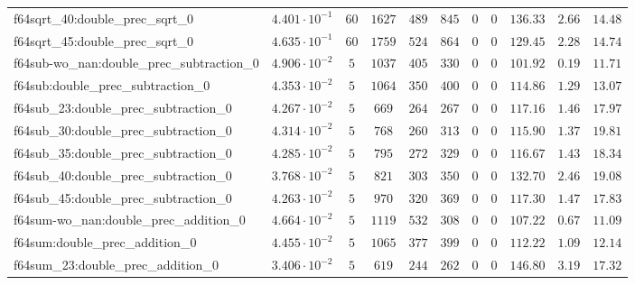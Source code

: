 \begin{tabular}{|l|c|c|c|c|c|c|c|c|c|c|}
f64sqrt\_40:double\_prec\_sqrt\_0              & $ 4.401 \cdot 10^{-1} $ & $ 60     $ & $ 1627   $ & $ 489   $ & $ 845   $ & $ 0   $ & $ 0 $ & $ 136.33      $ & $ 2.66    $ & $ 14.48   $ \\
f64sqrt\_45:double\_prec\_sqrt\_0              & $ 4.635 \cdot 10^{-1} $ & $ 60     $ & $ 1759   $ & $ 524   $ & $ 864   $ & $ 0   $ & $ 0 $ & $ 129.45      $ & $ 2.28    $ & $ 14.74   $ \\
f64sub-wo\_nan:double\_prec\_subtraction\_0    & $ 4.906 \cdot 10^{-2} $ & $ 5      $ & $ 1037   $ & $ 405   $ & $ 330   $ & $ 0   $ & $ 0 $ & $ 101.92      $ & $ 0.19    $ & $ 11.71   $ \\
f64sub:double\_prec\_subtraction\_0            & $ 4.353 \cdot 10^{-2} $ & $ 5      $ & $ 1064   $ & $ 350   $ & $ 400   $ & $ 0   $ & $ 0 $ & $ 114.86      $ & $ 1.29    $ & $ 13.07   $ \\
f64sub\_23:double\_prec\_subtraction\_0        & $ 4.267 \cdot 10^{-2} $ & $ 5      $ & $ 669    $ & $ 264   $ & $ 267   $ & $ 0   $ & $ 0 $ & $ 117.16      $ & $ 1.46    $ & $ 17.97   $ \\
f64sub\_30:double\_prec\_subtraction\_0        & $ 4.314 \cdot 10^{-2} $ & $ 5      $ & $ 768    $ & $ 260   $ & $ 313   $ & $ 0   $ & $ 0 $ & $ 115.90      $ & $ 1.37    $ & $ 19.81   $ \\
f64sub\_35:double\_prec\_subtraction\_0        & $ 4.285 \cdot 10^{-2} $ & $ 5      $ & $ 795    $ & $ 272   $ & $ 329   $ & $ 0   $ & $ 0 $ & $ 116.67      $ & $ 1.43    $ & $ 18.34   $ \\
f64sub\_40:double\_prec\_subtraction\_0        & $ 3.768 \cdot 10^{-2} $ & $ 5      $ & $ 821    $ & $ 303   $ & $ 350   $ & $ 0   $ & $ 0 $ & $ 132.70      $ & $ 2.46    $ & $ 19.08   $ \\
f64sub\_45:double\_prec\_subtraction\_0        & $ 4.263 \cdot 10^{-2} $ & $ 5      $ & $ 970    $ & $ 320   $ & $ 369   $ & $ 0   $ & $ 0 $ & $ 117.30      $ & $ 1.47    $ & $ 17.83   $ \\
f64sum-wo\_nan:double\_prec\_addition\_0       & $ 4.664 \cdot 10^{-2} $ & $ 5      $ & $ 1119   $ & $ 532   $ & $ 308   $ & $ 0   $ & $ 0 $ & $ 107.22      $ & $ 0.67    $ & $ 11.09   $ \\
f64sum:double\_prec\_addition\_0               & $ 4.455 \cdot 10^{-2} $ & $ 5      $ & $ 1065   $ & $ 377   $ & $ 399   $ & $ 0   $ & $ 0 $ & $ 112.22      $ & $ 1.09    $ & $ 12.14   $ \\
f64sum\_23:double\_prec\_addition\_0           & $ 3.406 \cdot 10^{-2} $ & $ 5      $ & $ 619    $ & $ 244   $ & $ 262   $ & $ 0   $ & $ 0 $ & $ 146.80      $ & $ 3.19    $ & $ 17.32   $ \\

\end{tabular}
